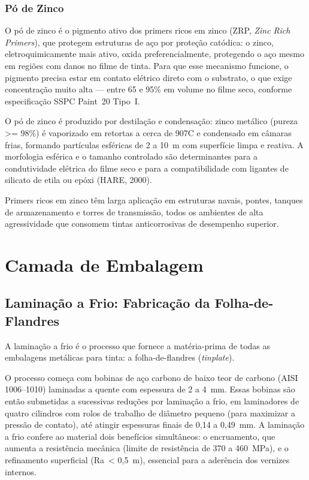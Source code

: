 \documentclass[
  12pt,
  a4paper,
  oneside,
  brazil,
  chapter=TITLE
]{article}
\newcommand{\secbreak}{\clearpage}
\let\oldsection\section
\renewcommand{\section}{\secbreak\oldsection}
\begin{document}
\subsubsection{Pó de Zinco}\label{po-zinco}

O pó de zinco é o pigmento ativo dos primers ricos em zinco (ZRP,
\textit{Zinc Rich Primers}), que protegem estruturas de aço por proteção
catódica: o zinco, eletroquimicamente mais ativo, oxida preferencialmente,
protegendo o aço mesmo em regiões com danos no filme de tinta. Para que esse
mecanismo funcione, o pigmento precisa estar em contato elétrico direto com o
substrato, o que exige concentração muito alta --- entre 65 e 95\% em volume no
filme seco, conforme especificação SSPC Paint~20 Tipo~I.

O pó de zinco é produzido por destilação e condensação: zinco metálico (pureza \textgreater{}=
98\%) é vaporizado em retortas a cerca de 907\textdegree{}C e condensado em câmaras frias,
formando partículas esféricas de 2 a 10~\textmu m com superfície limpa e reativa. A
morfologia esférica e o tamanho controlado são determinantes para a condutividade
elétrica do filme seco e para a compatibilidade com ligantes de silicato de etila
ou epóxi (HARE, 2000).

Primers ricos em zinco têm larga aplicação em estruturas navais, pontes, tanques
de armazenamento e torres de transmissão, todos os ambientes de alta agressividade
que consomem tintas anticorrosivas de desempenho superior.

\section{Camada de Embalagem}\label{camada-embalagem}

\subsection{Laminação a Frio: Fabricação da Folha-de-Flandres}\label{laminacao}

A laminação a frio é o processo que fornece a matéria-prima de todas as
embalagens metálicas para tinta: a folha-de-flandres (\textit{tinplate}).

O processo começa com bobinas de aço carbono de baixo teor de carbono (AISI
1006--1010) laminadas a quente com espessura de 2 a 4~mm. Essas bobinas são
então submetidas a sucessivas reduções por laminação a frio, em laminadores de
quatro cilindros com rolos de trabalho de diâmetro pequeno (para maximizar a
pressão de contato), até atingir espessuras finais de 0,14 a 0,49~mm. A
laminação a frio confere ao material dois benefícios simultâneos: o encruamento,
que aumenta a resistência mecânica (limite de resistência de 370 a 460~MPa), e o
refinamento superficial (Ra~< 0,5~\textmu m), essencial para a aderência dos vernizes
internos.
\end{document}
